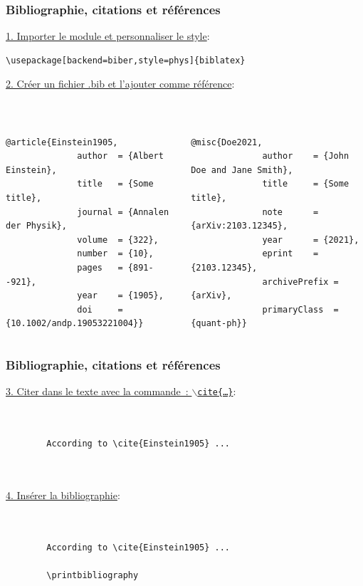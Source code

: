 \begin{frame}[fragile]
    \frametitle{Bibliographie, citations et références}
    \underline{1. Importer le module et personnaliser le style}:
    \begin{lstlisting}[xleftmargin=-1.5cm, basicstyle=\small]
        \usepackage[backend=biber,style=phys]{biblatex}
    \end{lstlisting}
    \vfill
    \pause
    \underline{2. Créer un fichier .bib et l'ajouter comme référence}:
    \begin{lstlisting}[xleftmargin=-1.5cm, basicstyle=\small]
        
    \end{lstlisting}
    \begin{columns}
        \begin{lstlisting}[xleftmargin=-1.5cm, basicstyle=\tiny]
            @article{Einstein1905,
              author  = {Albert Einstein},
              title   = {Some title},
              journal = {Annalen der Physik},
              volume  = {322},
              number  = {10},
              pages   = {891--921},
              year    = {1905},
              doi     = {10.1002/andp.19053221004}}
        \end{lstlisting}
        \begin{lstlisting}[xleftmargin=-1.5cm, basicstyle=\tiny]
            @misc{Doe2021,
              author    = {John Doe and Jane Smith},
              title     = {Some title},
              note      = {arXiv:2103.12345},
              year      = {2021},
              eprint    = {2103.12345},
              archivePrefix = {arXiv},
              primaryClass  = {quant-ph}}
        \end{lstlisting}
    \end{columns}
\end{frame}

\begin{frame}[fragile]
    \frametitle{Bibliographie, citations et références}
    \underline{3. Citer dans le texte avec la commande~: \texttt{$\backslash$cite\{\dots\}}}:
    \vfill
    \begin{lstlisting}[xleftmargin=-1cm, basicstyle=\small]
       

        According to \cite{Einstein1905} ...

        
    \end{lstlisting}
    \pause
    \vfill
    \underline{4. Insérer la bibliographie}:
    \vfill
    \begin{lstlisting}[xleftmargin=-1cm, basicstyle=\small]
       

        According to \cite{Einstein1905} ...

        \printbibliography

        
    \end{lstlisting}
\end{frame}

